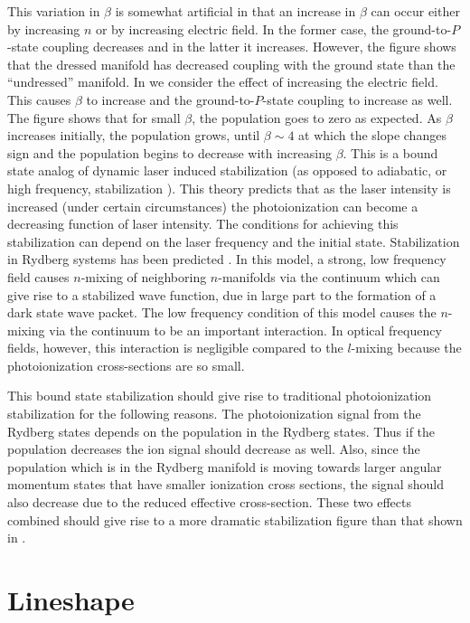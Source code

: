 This variation in $\beta$ is somewhat artificial in that an increase in
$\beta$ can occur either by increasing $n$ or by increasing electric field.
In the former case, the ground-to-$P$-state coupling decreases and in the
latter it increases.  However, the figure shows that the dressed manifold has
decreased coupling with the ground state than the ``undressed'' manifold.  In
 we consider the effect of increasing the electric field.  This
causes $\beta$ to increase and the ground-to-$P$-state coupling to increase
as well.  The figure shows that for small $\beta$, the population goes to zero as
expected. As $\beta$ increases initially, the population grows, until $\beta
\sim 4$ at which the slope changes sign and the population begins to decrease
with increasing $\beta$.  This is a bound state analog of dynamic laser
induced stabilization \cite{Burnett:91,Huens:93} (as opposed to adiabatic, or
high frequency, stabilization \cite{Pont:88}).  This theory predicts that as
the laser intensity is increased (under certain circumstances) the
photoionization can become a decreasing function of laser intensity.  The
conditions for achieving this stabilization can depend on the laser frequency
and the initial state.  Stabilization in Rydberg systems has been
predicted \cite{Fedorov:90}.  In this model, a strong, low frequency field causes
$n$-mixing of neighboring $n$-manifolds via the continuum which can give rise
to a stabilized wave function, due in large part to the formation of a dark
state wave packet.  The low frequency condition of this model causes the
$n$-mixing via the continuum to be an important interaction.  In optical
frequency fields, however, this interaction is negligible compared to the
$l$-mixing because the photoionization cross-sections are so small.

This bound state stabilization should give rise to traditional photoionization
stabilization for the following reasons.  The photoionization signal from the
Rydberg states depends on the population in the Rydberg states.  Thus if the
population decreases the ion signal should decrease as well.  Also, since the
population which is in the Rydberg manifold is moving towards larger angular
momentum states that have smaller ionization cross sections, the signal should
also decrease due to the reduced effective cross-section.  These two effects
combined should give rise to a more dramatic stabilization figure than that
shown in .

\section{Lineshape}
\hspace{\parindent}

